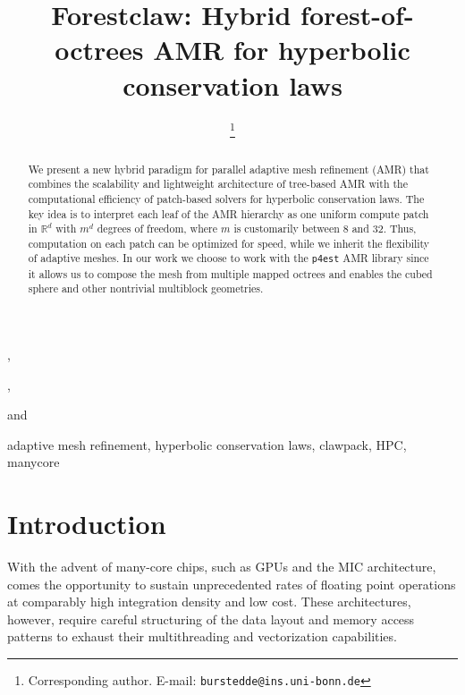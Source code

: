 \documentclass{IOS-Book-Article}     %
\newcommand{\sR}{\mathbb{R}}
\newcommand{\forestclaw}{Forestclaw\xspace}
\newcommand{\pforest}{\texttt{p4est}\xspace}
\begin{document}
\begin{frontmatter}          %
%
\title{\forestclaw:
        Hybrid forest-of-octrees AMR for hyperbolic conservation laws}
\runningtitle{\forestclaw}

%
\author[A]{ %
\thanks{Corresponding author.  E-mail: \texttt{burstedde@ins.uni-bonn.de}}},
\author[B]{ },
\author[C]{ } and
\author[C]{ }
\address[A]{Institut f\"ur Numerische Simulation, Universit\"at Bonn, Germany}
\address[B]{Boise State University, Idaho, USA}
\address[C]{Institute for Computational Engineering and Sciences,\\
The University of Texas at Austin, USA}

\begin{abstract}
We present a new hybrid paradigm for parallel adaptive mesh refinement (AMR)
that combines the scalability and lightweight architecture of tree-based AMR
with the computational efficiency of patch-based solvers for hyperbolic
conservation laws.  The key idea is to interpret each leaf of the AMR hierarchy
as one uniform compute patch in $\sR^d$ with $m^d$ degrees of freedom, where $m$ is
customarily between 8 and 32.  Thus, computation on each patch can be optimized
for speed, while we inherit the flexibility of adaptive meshes.  In our work we
choose to work with the \pforest AMR library since it allows us to compose the mesh
from multiple mapped octrees and enables the cubed sphere and other
nontrivial multiblock geometries.
\end{abstract}

\begin{keyword}
adaptive mesh refinement,
hyperbolic conservation laws,
clawpack,
HPC,
manycore
\end{keyword}

\end{frontmatter}


\section{Introduction}

With the advent of many-core chips, such as GPUs and the MIC architecture, comes the opportunity to sustain unprecedented rates of floating point
operations at comparably high integration density and low cost.  These
architectures, however, require careful structuring of the data layout and
memory access patterns to exhaust their multithreading and vectorization
capabilities.
\end{document}
